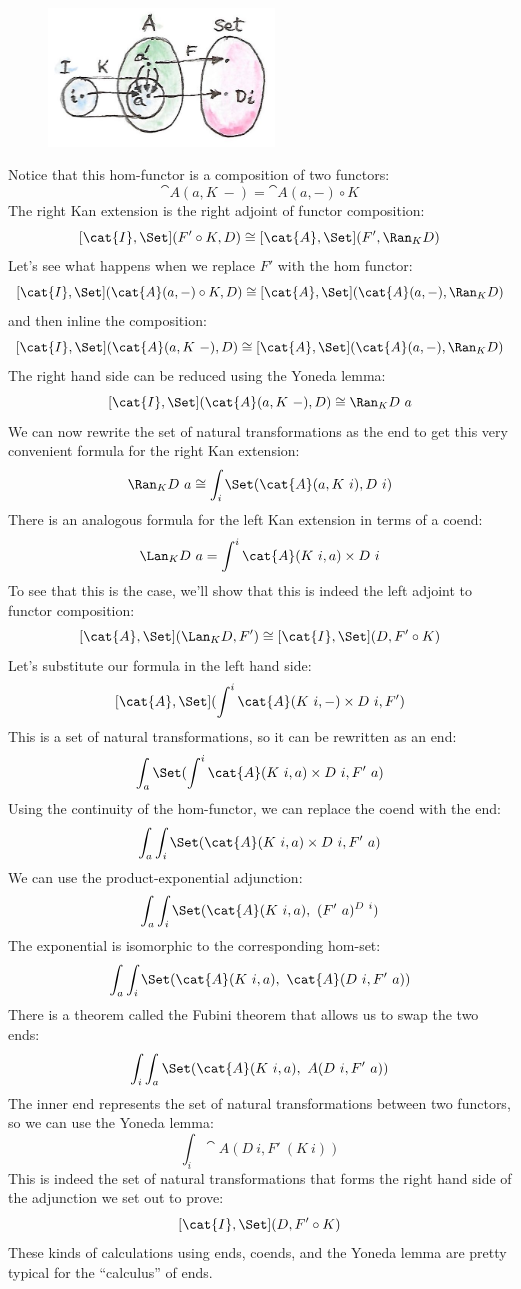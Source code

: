 \begin{figure}[H]
\centering
\includegraphics[width=60mm]{images/kan13.jpg}
\end{figure}

\noindent
Notice that this hom-functor is a composition of two functors:
\[\cat{A}(a, K\ -) = \cat{A}(a, -) \circ K\]
The right Kan extension is the right adjoint of functor composition:
\[[\cat{I}, \Set](F' \circ K, D) \cong [\cat{A}, \Set](F', \Ran_{K}D)\]
Let's see what happens when we replace $F'$ with the hom
functor:
\[[\cat{I}, \Set](\cat{A}(a, -) \circ K, D) \cong [\cat{A}, \Set](\cat{A}(a, -), \Ran_{K}D)\]
and then inline the composition:
\[[\cat{I}, \Set](\cat{A}(a, K\ -), D) \cong [\cat{A}, \Set](\cat{A}(a, -), \Ran_{K}D)\]
The right hand side can be reduced using the Yoneda lemma:
\[[\cat{I}, \Set](\cat{A}(a, K\ -), D) \cong \Ran_{K}D\ a\]
We can now rewrite the set of natural transformations as the end to get
this very convenient formula for the right Kan extension:
\[\Ran_{K}D\ a \cong \int_i \Set(\cat{A}(a, K\ i), D\ i)\]
There is an analogous formula for the left Kan extension in terms of a
coend:
\[\Lan_{K}D\ a = \int^i \cat{A}(K\ i, a)\times{}D\ i\]
To see that this is the case, we'll show that this is indeed the left
adjoint to functor composition:
\[[\cat{A}, \Set](\Lan_{K}D, F') \cong [\cat{I}, \Set](D, F' \circ K)\]
Let's substitute our formula in the left hand side:
\[[\cat{A}, \Set](\int^i \cat{A}(K\ i, -)\times{}D\ i, F')\]
This is a set of natural transformations, so it can be rewritten as an
end:
\[\int_a \Set(\int^i \cat{A}(K\ i, a)\times{}D\ i, F'\ a)\]
Using the continuity of the hom-functor, we can replace the coend with
the end:
\[\int_a \int_i \Set(\cat{A}(K\ i, a)\times{}D\ i, F'\ a)\]
We can use the product-exponential adjunction:
\[\int_a \int_i \Set(\cat{A}(K\ i, a),\ (F'\ a)^{D\ i})\]
The exponential is isomorphic to the corresponding hom-set:
\[\int_a \int_i \Set(\cat{A}(K\ i, a),\ \cat{A}(D\ i, F'\ a))\]
There is a theorem called the Fubini theorem that allows us to swap the
two ends:
\[\int_i \int_a \Set(\cat{A}(K\ i, a),\ A(D\ i, F'\ a))\]
The inner end represents the set of natural transformations between two
functors, so we can use the Yoneda lemma:
\[\int_i \cat{A}(D\ i, F'\ (K\ i))\]
This is indeed the set of natural transformations that forms the right
hand side of the adjunction we set out to prove:
\[[\cat{I}, \Set](D, F' \circ K)\]
These kinds of calculations using ends, coends, and the Yoneda lemma are
pretty typical for the ``calculus'' of ends.

